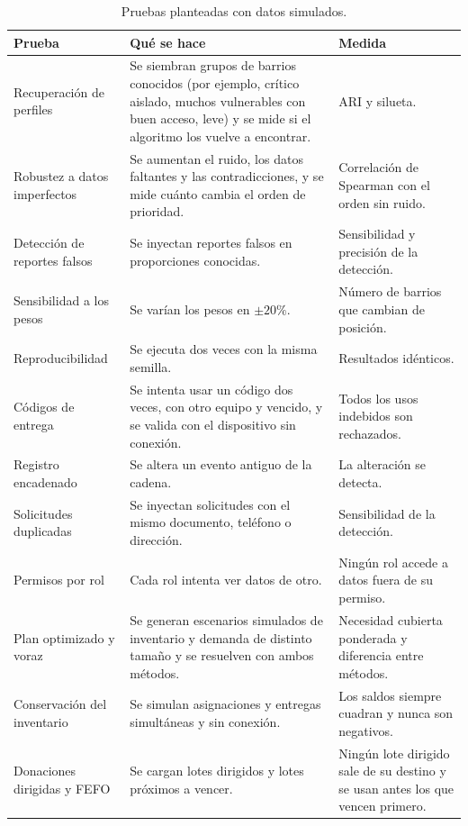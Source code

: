 \begin{table}[H]
\centering
\caption{Pruebas planteadas con datos simulados.}
\begin{tabularx}{\textwidth}{@{}p{3.6cm}Xp{3.3cm}@{}}
\toprule
\textbf{Prueba} & \textbf{Qué se hace} & \textbf{Medida} \\
\midrule
Recuperación de perfiles & Se siembran grupos de barrios conocidos (por ejemplo, crítico aislado, muchos vulnerables con buen acceso, leve) y se mide si el algoritmo los vuelve a encontrar. & ARI y silueta. \\
Robustez a datos imperfectos & Se aumentan el ruido, los datos faltantes y las contradicciones, y se mide cuánto cambia el orden de prioridad. & Correlación de Spearman con el orden sin ruido. \\
Detección de reportes falsos & Se inyectan reportes falsos en proporciones conocidas. & Sensibilidad y precisión de la detección. \\
Sensibilidad a los pesos & Se varían los pesos en $\pm 20\%$. & Número de barrios que cambian de posición. \\
Reproducibilidad & Se ejecuta dos veces con la misma semilla. & Resultados idénticos. \\
Códigos de entrega & Se intenta usar un código dos veces, con otro equipo y vencido, y se valida con el dispositivo sin conexión. & Todos los usos indebidos son rechazados. \\
Registro encadenado & Se altera un evento antiguo de la cadena. & La alteración se detecta. \\
Solicitudes duplicadas & Se inyectan solicitudes con el mismo documento, teléfono o dirección. & Sensibilidad de la detección. \\
Permisos por rol & Cada rol intenta ver datos de otro. & Ningún rol accede a datos fuera de su permiso. \\
Plan optimizado y voraz & Se generan escenarios simulados de inventario y demanda de distinto tamaño y se resuelven con ambos métodos. & Necesidad cubierta ponderada y diferencia entre métodos. \\
Conservación del inventario & Se simulan asignaciones y entregas simultáneas y sin conexión. & Los saldos siempre cuadran y nunca son negativos. \\
Donaciones dirigidas y FEFO & Se cargan lotes dirigidos y lotes próximos a vencer. & Ningún lote dirigido sale de su destino y se usan antes los que vencen primero. \\
\bottomrule
\end{tabularx}
\end{table}

